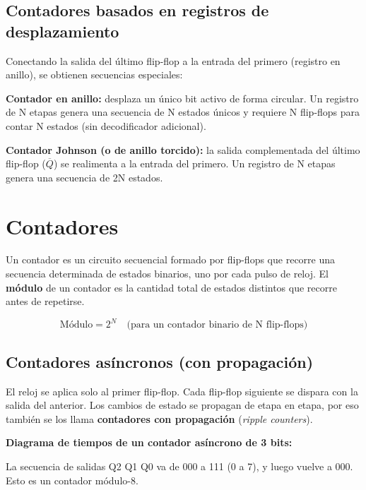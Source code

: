 \subsection{Contadores basados en registros de desplazamiento}

Conectando la salida del último flip-flop a la entrada del primero (registro en anillo), se obtienen secuencias especiales:

\textbf{Contador en anillo:} desplaza un único bit activo de forma circular. Un registro de N etapas genera una secuencia de N estados únicos y requiere N flip-flops para contar N estados (sin decodificador adicional).

\textbf{Contador Johnson (o de anillo torcido):} la salida complementada del último flip-flop ($\overline{Q}$) se realimenta a la entrada del primero. Un registro de N etapas genera una secuencia de 2N estados.

\section{Contadores}

Un contador es un circuito secuencial formado por flip-flops que recorre una secuencia determinada de estados binarios, uno por cada pulso de reloj. El \textbf{módulo} de un contador es la cantidad total de estados distintos que recorre antes de repetirse.

$$\text{Módulo} = 2^N \quad \text{(para un contador binario de N flip-flops)}$$

\subsection{Contadores asíncronos (con propagación)}

El reloj se aplica solo al primer flip-flop. Cada flip-flop siguiente se dispara con la salida del anterior. Los cambios de estado se propagan de etapa en etapa, por eso también se los llama \textbf{contadores con propagación} (\textit{ripple counters}).


\textbf{Diagrama de tiempos de un contador asíncrono de 3 bits:}


La secuencia de salidas Q2 Q1 Q0 va de 000 a 111 (0 a 7), y luego vuelve a 000. Esto es un contador módulo-8.


